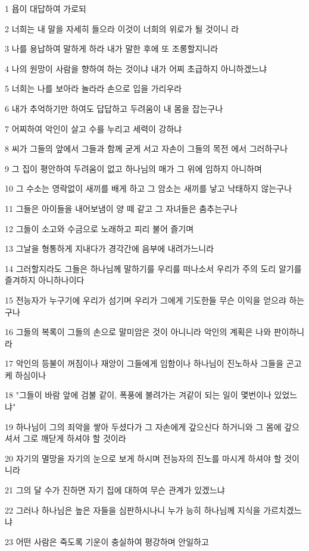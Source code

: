 \par 1 욥이 대답하여 가로되
\par 2 너희는 내 말을 자세히 들으라 이것이 너희의 위로가 될 것이니 라
\par 3 나를 용납하여 말하게 하라 내가 말한 후에 또 조롱할지니라
\par 4 나의 원망이 사람을 향하여 하는 것이냐 내가 어찌 초급하지 아니하겠느냐
\par 5 너희는 나를 보아라 놀라라 손으로 입을 가리우라
\par 6 내가 추억하기만 하여도 답답하고 두려움이 내 몸을 잡는구나
\par 7 어찌하여 악인이 살고 수를 누리고 세력이 강하냐
\par 8 씨가 그들의 앞에서 그들과 함께 굳게 서고 자손이 그들의 목전 에서 그러하구나
\par 9 그 집이 평안하여 두려움이 없고 하나님의 매가 그 위에 임하지 아니하며
\par 10 그 수소는 영락없이 새끼를 배게 하고 그 암소는 새끼를 낳고 낙태하지 않는구나
\par 11 그들은 아이들을 내어보냄이 양 떼 같고 그 자녀들은 춤추는구나
\par 12 그들이 소고와 수금으로 노래하고 피리 불어 즐기며
\par 13 그날을 형통하게 지내다가 경각간에 음부에 내려가느니라
\par 14 그러할지라도 그들은 하나님께 말하기를 우리를 떠나소서 우리가 주의 도리 알기를 즐겨하지 아니하나이다
\par 15 전능자가 누구기에 우리가 섬기며 우리가 그에게 기도한들 무슨 이익을 얻으랴 하는구나
\par 16 그들의 복록이 그들의 손으로 말미암은 것이 아니니라 악인의 계획은 나와 판이하니라
\par 17 악인의 등불이 꺼짐이나 재앙이 그들에게 임함이나 하나님이 진노하사 그들을 곤고케 하심이나
\par 18 "그들이 바람 앞에 검불 같이, 폭풍에 불려가는 겨같이 되는 일이 몇번이나 있었느냐"
\par 19 하나님이 그의 죄악을 쌓아 두셨다가 그 자손에게 갚으신다 하거니와 그 몸에 갚으셔서 그로 깨닫게 하셔야 할 것이라
\par 20 자기의 멸망을 자기의 눈으로 보게 하시며 전능자의 진노를 마시게 하셔야 할 것이니라
\par 21 그의 달 수가 진하면 자기 집에 대하여 무슨 관계가 있겠느냐
\par 22 그러나 하나님은 높은 자들을 심판하시나니 누가 능히 하나님께 지식을 가르치겠느냐
\par 23 어떤 사람은 죽도록 기운이 충실하여 평강하며 안일하고

